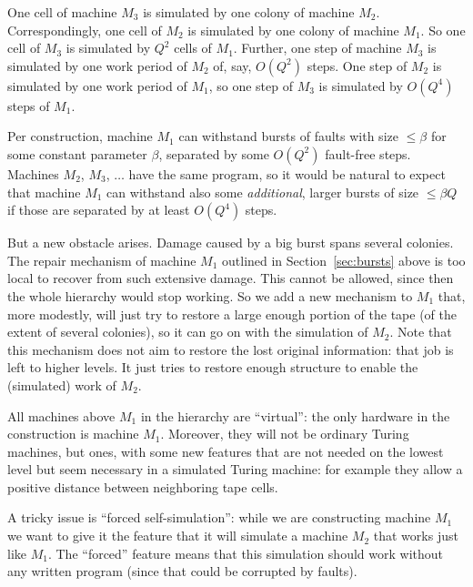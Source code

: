 \documentclass[11pt]{memoir}
\theoremstyle{definition} %
\renewcommand{\le}{\leq}
\newcommand{\Q}{Q}
\begin{document}
One cell of machine \( M_3 \) is simulated by one colony of machine \( M_{2} \).
Correspondingly, one cell of \( M_{2} \) is simulated by
one colony of machine \( M_{1} \).
So one cell of \( M_3 \) is simulated by \( \Q^{2} \) cells of \( M_{1} \).
Further, one step of machine \( M_3 \) is simulated by one
work period of \( M_{2} \) of, say, \( O(\Q^{2}) \) steps.
One step of \( M_{2} \) is simulated by one work period of \( M_{1} \),
so one step of \( M_3 \) is simulated by \( O(\Q^{4}) \) steps of \( M_{1} \).

Per construction, machine \( M_{1} \) can withstand
bursts of faults with size  \( \le \beta \) for some constant parameter \( \beta \),
separated by some \( O(\Q^{2}) \) fault-free steps.
Machines \( M_{2} \), \( M_3 \), \( \dots \) have the same program, so it
would be natural to expect that machine
\( M_{1} \) can withstand also some \emph{additional}, larger bursts
of size \( \le \beta \Q \) if those are separated by at least \( O(\Q^{4}) \) steps.

But a new obstacle arises.
Damage caused by a big burst spans several colonies.
The repair mechanism of machine \( M_{1} \) outlined in Section~\ref{sec:bursts} above 
is too local to recover from such extensive damage.
This cannot be allowed, since then the whole hierarchy would stop working.
So we add a new mechanism to \( M_{1} \) that, more modestly,
will just try to restore a large enough portion of the
tape (of the extent of several colonies), so it can go on with the simulation of \( M_{2} \).
Note that this mechanism does not aim to restore the lost 
original information: that job is left to higher levels.
It just tries to restore enough structure to enable the (simulated) work of \( M_{2} \).

All machines above \( M_{1} \) in the hierarchy are
``virtual'': the only hardware in the construction is machine \( M_{1} \).
Moreover, they will not be ordinary Turing machines, but  ones,
with some new features that are not needed on the lowest level but seem necessary
in a simulated Turing machine: for example they
allow a positive distance between neighboring tape cells.

A tricky issue is ``forced self-simulation'': while we are constructing machine \( M_{1} \)
we want to give it the feature that it will simulate a machine \( M_{2} \) that
works just like \( M_{1} \).
The ``forced'' feature means that this simulation should
work without any written program (since that could be corrupted by faults).
\end{document}
